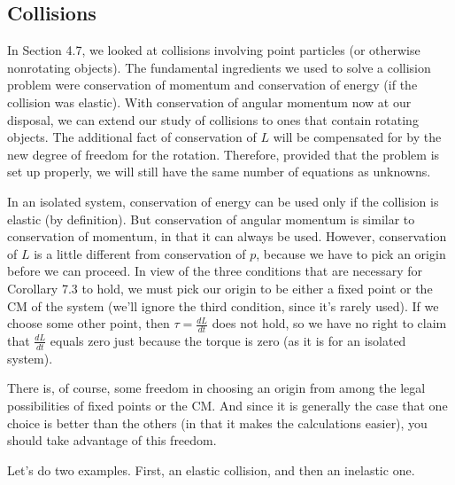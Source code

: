 \documentclass[11pt, draft]{article}
\begin{document}
\subsection{Collisions}
In Section 4.7, we looked at collisions involving point particles (or otherwise
nonrotating objects). The fundamental ingredients we used to solve a collision
problem were conservation of momentum and conservation of energy (if the
collision was elastic). With conservation of angular momentum now at our
disposal, we can extend our study of collisions to ones that contain rotating
objects. The additional fact of conservation of \(L\) will be compensated for
by the new degree of freedom for the rotation. Therefore, provided that the
problem is set up properly, we will still have the same number of equations as
unknowns.

In an isolated system, conservation of energy can be used only if the collision
is elastic (by definition). But conservation of angular momentum is similar to
conservation of momentum, in that it can always be used. However, conservation
of \(L\) is a little different from conservation of \(p\), because we have to
pick an origin before we can proceed. In view of the three conditions that are
necessary for Corollary 7.3 to hold, we must pick our origin to be either a
fixed point or the CM of the system (we’ll ignore the third condition, since
it’s rarely used). If we choose some other point, then \(\tau = \frac{dL}{dt}\)
does not hold, so we have no right to claim that \(\frac{dL}{dt}\) equals zero
just because the torque is zero (as it is for an isolated system).

There is, of course, some freedom in choosing an origin from among the legal
possibilities of fixed points or the CM. And since it is generally the case
that one choice is better than the others (in that it makes the calculations
easier), you should take advantage of this freedom.

Let’s do two examples. First, an elastic collision, and then an inelastic one.
\end{document}
